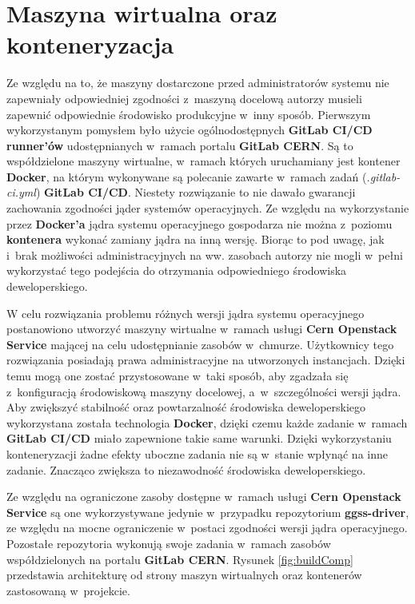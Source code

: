\newpage
\section{Maszyna wirtualna oraz konteneryzacja}
\label{sec:wirtDocker}

Ze względu na to, że maszyny dostarczone przed administratorów systemu nie zapewniały odpowiedniej zgodności z~maszyną docelową autorzy musieli zapewnić odpowiednie środowisko produkcyjne w~inny sposób. Pierwszym wykorzystanym pomysłem było użycie ogólnodostępnych \textbf{GitLab CI/CD runner'ów} udostępnianych w~ramach portalu \textbf{GitLab CERN}. Są to współdzielone maszyny wirtualne, w~ramach których uruchamiany jest kontener \textbf{Docker}, na którym wykonywane są polecanie zawarte w~ramach zadań (\textit{.gitlab-ci.yml}) \textbf {GitLab CI/CD}. Niestety rozwiązanie to nie dawało gwarancji zachowania zgodności jąder systemów operacyjnych. Ze względu na wykorzystanie przez \textbf{Docker'a} jądra systemu operacyjnego gospodarza nie można z~poziomu \textbf{kontenera} wykonać zamiany jądra na inną wersję. Biorąc to pod uwagę, jak i~brak możliwości administracyjnych na ww. zasobach autorzy nie mogli w~pełni wykorzystać tego podejścia do otrzymania odpowiedniego środowiska deweloperskiego.

W celu rozwiązania problemu różnych wersji jądra systemu operacyjnego postanowiono utworzyć maszyny wirtualne w~ramach usługi \textbf{Cern Openstack Service} mającej na celu udostępnianie zasobów w~chmurze. Użytkownicy tego rozwiązania posiadają prawa administracyjne na utworzonych instancjach. Dzięki temu mogą one zostać przystosowane w~taki sposób, aby zgadzała się z~konfiguracją środowiskową maszyny docelowej, a~w~szczególności wersji jądra. Aby zwiększyć stabilność oraz powtarzalność środowiska deweloperskiego wykorzystana została technologia \textbf{Docker}, dzięki czemu każde zadanie w~ramach \textbf{GitLab CI/CD} miało zapewnione takie same warunki. Dzięki wykorzystaniu konteneryzacji żadne efekty uboczne zadania nie są w~stanie wpłynąć na inne zadanie. Znacząco zwiększa to niezawodność środowiska deweloperskiego.

Ze względu na ograniczone zasoby dostępne w~ramach usługi \textbf{Cern Openstack Service} są one wykorzystywane jedynie w~przypadku repozytorium \textbf{ggss-driver}, ze względu na mocne ograniczenie w~postaci zgodności wersji jądra operacyjnego. Pozostałe repozytoria wykonują swoje zadania w~ramach zasobów współdzielonych na portalu \textbf{GitLab CERN}. Rysunek \ref{fig:buildComp} przedstawia architekturę od strony maszyn wirtualnych oraz kontenerów zastosowaną w~projekcie.

